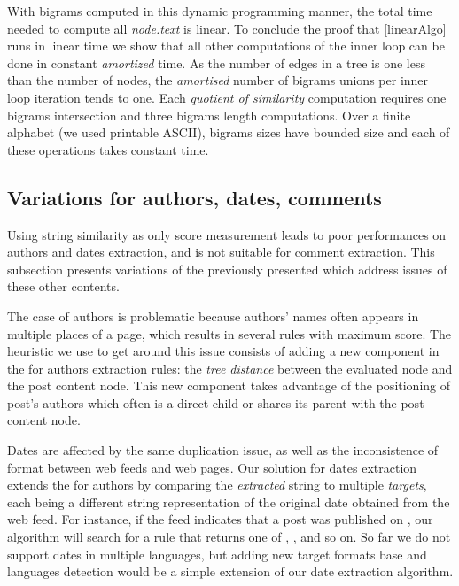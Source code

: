 \linearAlgo

With bigrams computed in this dynamic programming manner, the total time needed to compute all \code{(}\emph{node.text}\code{)} is linear. To conclude the proof that \autoref{linearAlgo} runs in linear time we show that all other computations of the inner loop can be done in constant \emph{amortized} time. As the number of edges in a tree is one less than the number of nodes, the \emph{amortised} number of bigrams unions per inner loop iteration tends to one. Each \emph{quotient of similarity} computation requires one bigrams intersection and three bigrams length computations. Over a finite alphabet (we used printable ASCII), bigrams sizes have bounded size and each of these operations takes constant time.


\subsection{Variations for authors, dates, comments}
\label{variationsforauthorsdatesandcomments}

Using string similarity as only score measurement leads to poor performances on authors and dates extraction, and is not suitable for comment extraction. This subsection presents variations of the previously presented  which address issues of these other contents.

The case of authors is problematic because authors' names often appears in multiple places of a page, which results in several rules with maximum  score. The heuristic we use to get around this issue consists of adding a new component in the  for authors extraction rules: the \emph{tree distance} between the evaluated node and the post content node. This new component takes advantage of the positioning of post's authors which often is a direct child or shares its parent with the post content node.

Dates are affected by the same duplication issue, as well as the inconsistence of format between web feeds and web pages. Our solution for dates extraction extends the  for authors by comparing the \emph{extracted} string to multiple \emph{targets}, each being a different string representation of the original date obtained from the web feed. For instance, if the feed indicates that a post was published on , our algorithm will search for a rule that returns one of , ,  and so on. So far we do not support dates in multiple languages, but adding new target formats base and languages detection would be a simple extension of our date extraction algorithm.

